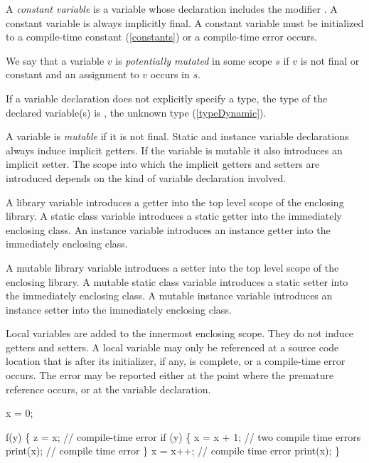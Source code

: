 \documentclass{article}
\begin{document}
\LMHash{}
A {\em constant variable} is a variable whose declaration includes the modifier \CONST{}. A constant variable is always implicitly final. A constant variable must be initialized to a compile-time constant (\ref{constants}) or a compile-time error occurs.

\LMHash{}
We say that a variable $v$ is {\em potentially mutated} in some scope $s$ if $v$ is not final or constant and an assignment to $v$ occurs in $s$.

\LMHash{}
If a variable declaration does not explicitly specify a type, the type of the declared variable(s) is  \DYNAMIC{}, the unknown type (\ref{typeDynamic}). 

\LMHash{}
A variable is {\em mutable} if it is not final.
Static and instance variable declarations always induce implicit getters. If the variable is mutable it also introduces an implicit setter.
The scope into which the implicit getters and setters are introduced depends on the kind of variable declaration involved. 

\LMHash{}
A library variable introduces a getter into the top level scope of the enclosing library. A static class variable introduces a static getter into the immediately enclosing class. An instance variable introduces an instance getter into the immediately enclosing class. 

\LMHash{}
A mutable library variable introduces a setter into the top level scope of the enclosing library. A mutable static class variable introduces a static setter into the immediately enclosing class. A mutable instance variable introduces an instance setter into the immediately enclosing class. 

\LMHash{}
Local variables are added to the innermost enclosing scope.  They do not induce getters and setters.  A local variable may only be referenced at a source code location that is after its initializer, if any, is complete, or a compile-time error occurs.  The error may be reported either at the point where the premature reference occurs, or at the variable declaration.



\begin{dartCode}
\VAR{} x = 0;

f(y) \{
  \VAR{} z = x; // compile-time error 
  if (y) \{
    x = x + 1; // two compile time errors
    print(x); // compile time error
  \}
 \VAR{} x = x++; // compile time error
 print(x);
\}
\end{dartCode}
\end{document}
